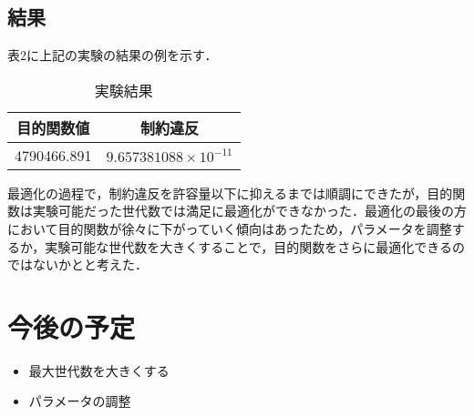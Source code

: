 \documentclass[twocolumn]{jarticle}
\begin{document}
	\subsection{結果}
	表2に上記の実験の結果の例を示す．
	\begin{table}[htbp]
		\begin{center}
			\caption{実験結果}
			\begin{tabular}{| c | c |} \hline
				目的関数値 & 制約違反 \\ \hline 
				4790466.891 &   $9.657381088\times10^{-11}$ \\ \hline
			\end{tabular}
		\end{center}
	\end{table}

	最適化の過程で，制約違反を許容量以下に抑えるまでは順調にできたが，目的関数は実験可能だった世代数では満足に最適化ができなかった．最適化の最後の方において目的関数が徐々に下がっていく傾向はあったため，パラメータを調整するか，実験可能な世代数を大きくすることで，目的関数をさらに最適化できるのではないかとと考えた．

	
\section{今後の予定}

\begin{itemize}
	\item 最大世代数を大きくする
	\item パラメータの調整
\end{itemize}

\end{document}

